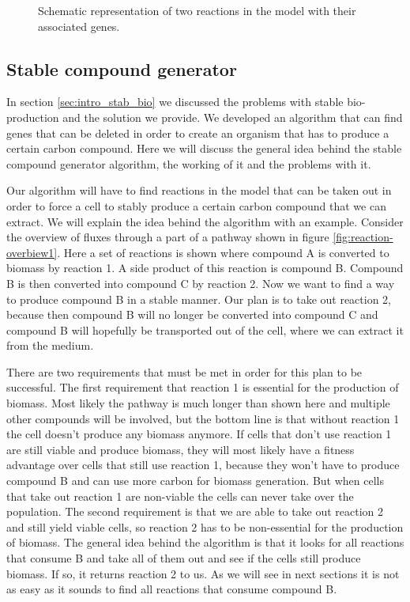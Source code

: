\documentclass[12pt]{report}
\begin{document}
\begin{figure}[hbtp]
  \centering
     
      \caption{Schematic representation of two reactions in the model with their associated genes.}
  \label{fig:genes1}
\end{figure}



\subsection{Stable compound generator}
In section \ref{sec:intro_stab_bio} we discussed the problems with stable bio-production and the solution we provide. We developed an algorithm that can find genes that can be deleted in order to create an organism that has to produce a certain carbon compound.  Here we will discuss the general idea behind the stable compound generator algorithm, the working of it and the problems with it.

Our algorithm will have to find reactions in the model that can be taken out in order to force a cell to stably produce a certain carbon compound that we can extract.
We will explain the idea behind the algorithm with an example. Consider the overview of fluxes through a part of a pathway shown in figure \ref{fig:reaction-overbiew1}. Here a set of reactions is shown where compound A is converted to biomass by reaction 1. A side product of this reaction is compound B. Compound B is then converted into compound C by reaction 2.
Now we want to find a way to produce compound B in a stable manner. Our plan is to take out reaction 2, because then compound B will no longer be converted into compound C and compound B will hopefully be transported out of the cell, where we can extract it from the medium.

There are two requirements that must be met in order for this plan to be successful.
The first requirement that reaction 1 is essential for the production of biomass. Most likely the pathway is much longer than shown here and multiple other compounds will be involved, but the bottom line is that without reaction 1 the cell doesn't produce any biomass anymore. If cells that don't use reaction 1 are still viable and produce biomass, they will most likely have a fitness advantage over cells that still use reaction 1, because they won't have to produce compound B and can use more carbon for biomass generation. But when cells that take out reaction 1 are non-viable the cells can never take over the population.
The second requirement is that we are able to take out reaction 2 and still yield viable cells, so reaction 2 has to be non-essential for the production of biomass. The general idea behind the algorithm is that it looks for all reactions that consume B and take all of them out and see if the cells still produce biomass. If so, it returns reaction 2 to us. As we will see in next sections it is not as easy as it sounds to find all reactions that consume compound B.
\end{document}
